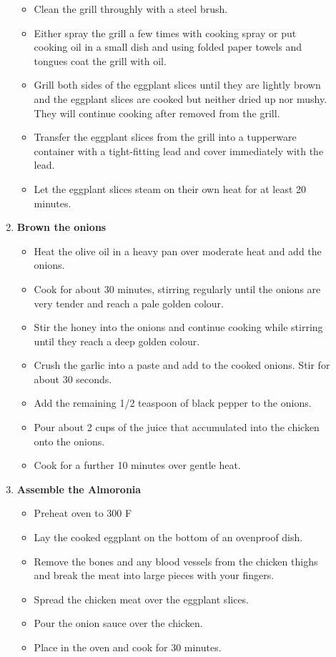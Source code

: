 \documentclass[11pt,letterpaper]{article}
\begin{document}
\begin{description}
\begin{enumerate}
\begin{itemize}
	\item Clean the grill throughly with a steel brush.
	\item Either spray the grill a few times with cooking spray or put cooking oil in a small dish and using folded paper towels and tongues coat the grill with oil.
	\item Grill both sides of the eggplant slices until they are lightly brown and the eggplant slices are cooked but neither dried up nor mushy. They will continue cooking after removed from the grill.
	\item Transfer the eggplant slices from the grill into a tupperware container with a tight-fitting lead and cover immediately with the lead.
	\item Let the eggplant slices steam on their own heat for at least 20 minutes.
	\end{itemize}
	\item {\bf Brown the onions}
	\begin{itemize}
	\item Heat the olive oil in a heavy pan over moderate heat and add the onions.
	\item Cook for about 30 minutes, stirring regularly until the onions are very tender and reach a pale golden colour.
	\item Stir the honey into the onions and continue cooking while stirring until they reach a deep golden colour. 
	\item Crush the garlic into a paste and add to the cooked onions. Stir for about 30 seconds.
	\item Add the remaining 1/2 teaspoon of black pepper to the onions.
	\item Pour about 2 cups of the juice that accumulated into the chicken onto the onions.
	\item Cook for a further 10 minutes over gentle heat.
	\end{itemize}
	\item {\bf Assemble the Almoronia}
	\begin{itemize}
	\item Preheat oven to 300 F
	\item Lay the cooked eggplant on the bottom of an ovenproof dish.
	\item Remove the bones and any blood vessels from the chicken thighs and break the meat into large pieces with your fingers.
	\item Spread the chicken meat over the eggplant slices.
	\item Pour the onion sauce over the chicken.
	\item Place in the oven and cook for 30 minutes.
	\end{itemize}
	\end{enumerate}
\end{description}
\end{document}
